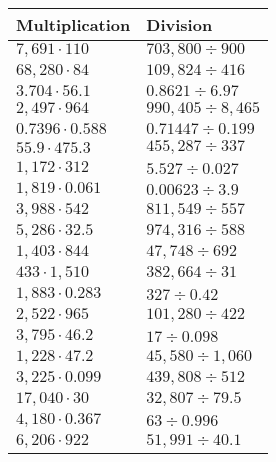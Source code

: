\begin{longtable}[]{@{}ll@{}}
\toprule
Multiplication & Division\tabularnewline
\midrule
\endhead
\(7,691\cdot110\) & \(703,800÷900\)\tabularnewline
\(68,280\cdot84\) & \(109,824÷416\)\tabularnewline
\(3.704\cdot56.1\) & \(0.8621÷6.97\)\tabularnewline
\(2,497\cdot964\) & \(990,405÷8,465\)\tabularnewline
\(0.7396\cdot0.588\) & \(0.71447÷0.199\)\tabularnewline
\(55.9\cdot475.3\) & \(455,287÷337\)\tabularnewline
\(1,172\cdot312\) & \(5.527÷0.027\)\tabularnewline
\(1,819\cdot0.061\) & \(0.00623÷3.9\)\tabularnewline
\(3,988\cdot542\) & \(811,549÷557\)\tabularnewline
\(5,286\cdot32.5\) & \(974,316÷588\)\tabularnewline
\(1,403\cdot844\) & \(47,748÷692\)\tabularnewline
\(433\cdot1,510\) & \(382,664÷31\)\tabularnewline
\(1,883\cdot0.283\) & \(327÷0.42\)\tabularnewline
\(2,522\cdot965\) & \(101,280÷422\)\tabularnewline
\(3,795\cdot46.2\) & \(17÷0.098\)\tabularnewline
\(1,228\cdot47.2\) & \(45,580÷1,060\)\tabularnewline
\(3,225\cdot0.099\) & \(439,808÷512\)\tabularnewline
\(17,040\cdot30\) & \(32,807÷79.5\)\tabularnewline
\(4,180\cdot0.367\) & \(63÷0.996\)\tabularnewline
\(6,206\cdot922\) & \(51,991÷40.1\)\tabularnewline
\bottomrule
\end{longtable}

